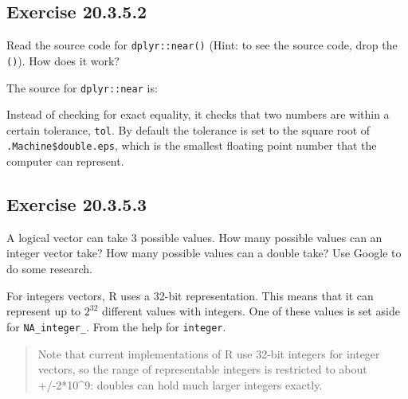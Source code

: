 \documentclass[]{book}
\newenvironment{Shaded}{\begin{snugshade}}{\end{snugshade}}
\newcommand{\CommentTok}[1]{\textcolor[rgb]{0.56,0.35,0.01}{\textit{#1}}}
\newcommand{\NormalTok}[1]{#1}
\newcommand{\OperatorTok}[1]{\textcolor[rgb]{0.81,0.36,0.00}{\textbf{#1}}}
\theoremstyle{plain}
\theoremstyle{remark}
\begin{document}
\hypertarget{exercise-20.3.5.2}{%
\subsection*{\texorpdfstring{Exercise {20.3.5.2}}{Exercise 20.3.5.2}}\label{exercise-20.3.5.2}}

Read the source code for \texttt{dplyr::near()} (Hint: to see the source code, drop the \texttt{()}). How does it work?

The source for \texttt{dplyr::near} is:

\begin{Shaded}
\end{Shaded}

Instead of checking for exact equality, it checks that two numbers are within a certain tolerance, \texttt{tol}.
By default the tolerance is set to the square root of \texttt{.Machine\$double.eps}, which is the smallest floating point number that the computer can represent.

\hypertarget{exercise-20.3.5.3}{%
\subsection*{\texorpdfstring{Exercise {20.3.5.3}}{Exercise 20.3.5.3}}\label{exercise-20.3.5.3}}

A logical vector can take 3 possible values. How many possible values can an integer vector take? How many possible values can a double take? Use Google to do some research.

For integers vectors, R uses a 32-bit representation. This means that it can represent up to \(2^{32}\) different values with integers. One of these values is set aside for \texttt{NA\_integer\_}.
From the help for \texttt{integer}.

\begin{quote}
Note that current implementations of R use 32-bit integers for integer vectors,
so the range of representable integers is restricted to about +/-2*10\^{}9: doubles
can hold much larger integers exactly.
\end{quote}
\end{document}
